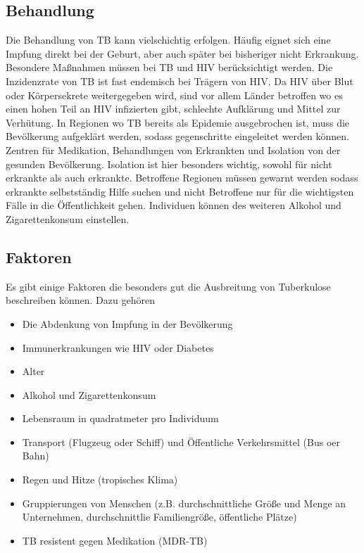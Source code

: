 \documentclass[paper=a4, fontsize=11pt, ngerman, abstract=on]{scrartcl}
\numberwithin{equation}{section} %
\numberwithin{figure}{section} %
\numberwithin{table}{section} %
\begin{document}
\subsection{Behandlung}

Die Behandlung von TB kann vielschichtig erfolgen. Häufig eignet sich eine Impfung direkt bei der Geburt, aber auch später bei bisheriger nicht Erkrankung. Besondere Maßnahmen müssen bei TB und HIV berücksichtigt werden. Die Inzidenzrate von TB ist fast endemisch bei Trägern von HIV. Da HIV über Blut oder Körpersekrete weitergegeben wird, sind vor allem Länder betroffen wo es einen hohen Teil an HIV infizierten gibt, schlechte Aufklärung und Mittel zur Verhütung. In Regionen wo TB bereits als Epidemie ausgebrochen ist, muss die Bevölkerung aufgeklärt werden, sodass gegenschritte eingeleitet werden können. Zentren für Medikation, Behandlungen von Erkrankten und Isolation von der gesunden Bevölkerung. Isolation ist hier besonders wichtig, sowohl für nicht erkrankte als auch erkrankte. Betroffene Regionen müssen gewarnt werden sodass erkrankte selbstständig Hilfe suchen und nicht Betroffene nur für die wichtigsten Fälle in die Öffentlichkeit gehen. Individuen können des weiteren Alkohol und Zigarettenkonsum einstellen.

\subsection{Faktoren}

Es gibt einige Faktoren die besonders gut die Ausbreitung von Tuberkulose beschreiben können. Dazu gehören

\begin{itemize}
  \item Die Abdenkung von Impfung in der Bevölkerung
  \item Immunerkrankungen wie HIV oder Diabetes
  \item Alter
  \item Alkohol und Zigarettenkonsum
  \item Lebensraum in quadratmeter pro Individuum
  \item Transport (Flugzeug oder Schiff) und Öffentliche Verkehrsmittel (Bus oer Bahn)
  \item Regen und Hitze (tropisches Klima)
  \item Gruppierungen von Menschen (z.B. durchschnittliche Größe und Menge an Unternehmen, durchschnittlie Familiengröße, öffentliche Plätze)
  \item TB resistent gegen Medikation (MDR-TB)
\end{itemize}
\end{document}
